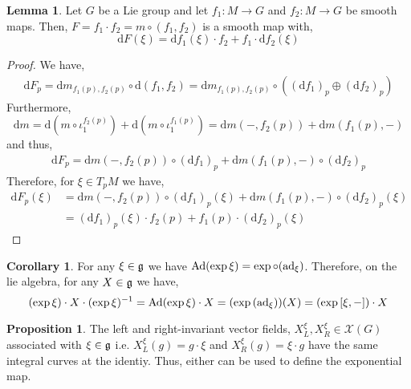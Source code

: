 \documentclass[12pt]{extarticle}
\theoremstyle{definition}
\newtheorem{lemma}[theorem]{Lemma}
\newtheorem{proposition}[theorem]{Proposition}
\newtheorem{corollary}[theorem]{Corollary}
\renewcommand{\d}[1]{\mathrm{d} #1}
\begin{document}
\begin{lemma}
Let $G$ be a Lie group and let $f_1 : M \to G$ and $f_2 : M \to G$ be smooth maps. Then, $F = f_1 \cdot f_2 = m \circ (f_1, f_2)$ is a smooth map with,
\[ \d{F}(\xi) = \d{f_1}(\xi) \cdot f_2 + f_1 \cdot \d{f_2}(\xi) \] 
\end{lemma}

\begin{proof}
We have,
\begin{align*}
\d{F}_p = \d{m}_{f_1(p), f_2(p)} \circ \d{(f_1, f_2)} = \d{m}_{f_1(p), f_2(p)} \circ ((\d{f_1})_p \oplus (\d{f_2})_p)
\end{align*}
Furthermore,
\[ \d{m} = \d{(m \circ \iota_1^{f_2(p)})} + \d{(m \circ \iota_1^{f_1(p)})} = \d{m(-,f_2(p))} + \d{m(f_1(p),-)} \]
and thus,
\begin{align*}
\d{F}_p = \d{m(-,f_2(p))} \circ (\d{f_1})_p + \d{m(f_1(p),-)} \circ (\d{f_2})_p
\end{align*}
Therefore, for $\xi \in T_p M$ we have,
\begin{align*}
\d{F}_p(\xi) & = \d{m(-,f_2(p))} \circ (\d{f_1})_p(\xi) + \d{m(f_1(p),-)} \circ (\d{f_2})_p(\xi)
\\
& = (\d{f_1})_p(\xi) \cdot f_2(p) + f_1(p) \cdot (\d{f_2})_p(\xi)
\end{align*}
\end{proof}

\begin{corollary}
For any $\xi \in \mathfrak{g}$ we have $\mathrm{Ad}(\exp{\xi}) = \exp \circ (\mathrm{ad}_\xi)$. Therefore, on the lie algebra, for any $X \in \mathfrak{g}$ we have,
\[ (\exp{\xi}) \cdot X \cdot (\exp{\xi})^{-1} = \mathrm{Ad}(\exp{\xi}) \cdot X = (\exp{(\mathrm{ad}_\xi)})(X) = (\exp{[\xi, - ]}) \cdot X \]  
\end{corollary}

\begin{proposition}
The left and right-invariant vector fields, $X^{\xi}_L, X^{\xi}_R \in \mathscr{X}(G)$ associated with $\xi \in \mathfrak{g}$ i.e. $X^{\xi}_L(g) = g \cdot \xi$ and $X^{\xi}_R(g) = \xi \cdot g$ have the same integral curves at the identiy. Thus, either can be used to define the exponential map.
\end{proposition}
\end{document}
